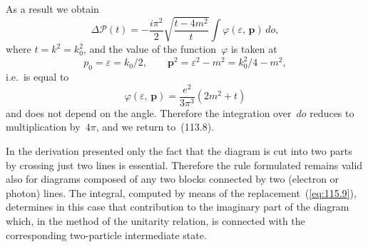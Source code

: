 As a result we obtain
\begin{equation}
\Delta\mathcal{P}(t) = -\frac{i\pi^2}{2}\sqrt{\frac{t - 4m^2}{t}}\int \varphi(\varepsilon,\,\mathbf{p})\,do,
\label{eq:115.10}
\end{equation}
where $t = k^2 = k_0^2$, and the value of the function~$\varphi$ is taken at
\[
p_0 = \varepsilon = k_0/2, \qquad \mathbf{p}^2 = \varepsilon^2 - m^2 = k_0^2/4 - m^2,
\]
i.e.\ is equal to
\[
\varphi(\varepsilon,\,\mathbf{p}) = \frac{e^2}{3\pi^3}(2m^2 + t)
\]
and does not depend on the angle. Therefore the integration over~$do$ reduces to multiplication by~$4\pi$, and we return to~(113.8).


In the derivation presented only the fact that the diagram is cut into two parts by crossing just two lines is essential. Therefore the rule formulated remains valid also for diagrams composed of any two blocks connected by two (electron or photon) lines. The integral, computed by means of the replacement~(\ref{eq:115.9}), determines in this case that contribution to the imaginary part of the diagram which, in the method of the unitarity relation, is connected with the corresponding two-particle intermediate state.
